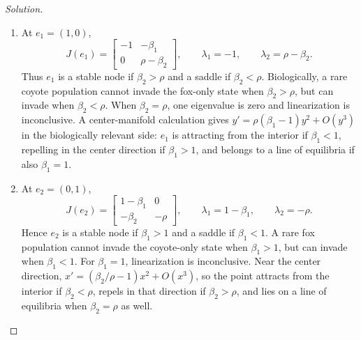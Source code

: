 \documentclass[12pt]{amsart}
\theoremstyle{conjecture}
\theoremstyle{definition}
\theoremstyle{question}
\theoremstyle{theorem}
\newenvironment{solution}
{\begin{proof}[Solution]}
{\end{proof}}
\begin{document}
\begin{enumerate}[leftmargin=2em]
\begin{solution}
\begin{enumerate}[label=(\alph*),leftmargin=2.2em]
          \begin{enumerate}[label=\roman*.,leftmargin=2em]
            \item At $e_1=(1,0)$,
            \[
                J(e_1)=\begin{bmatrix}-1&-\beta_1\\0&\rho-\beta_2\end{bmatrix},
                \qquad \lambda_1=-1,\qquad \lambda_2=\rho-\beta_2.
            \]
            Thus $e_1$ is a stable node if $\beta_2>\rho$ and a saddle if
            $\beta_2<\rho$.  Biologically, a rare coyote population cannot
            invade the fox-only state when $\beta_2>\rho$, but can invade when
            $\beta_2<\rho$.  When $\beta_2=\rho$, one eigenvalue is zero and
            linearization is inconclusive.  A center-manifold calculation gives
            $y'=\rho(\beta_1-1)y^2+O(y^3)$ in the biologically relevant side:
            $e_1$ is attracting from the interior if $\beta_1<1$, repelling in
            the center direction if $\beta_1>1$, and belongs to a line of
            equilibria if also $\beta_1=1$.

            \item At $e_2=(0,1)$,
            \[
                J(e_2)=\begin{bmatrix}1-\beta_1&0\\-\beta_2&-\rho\end{bmatrix},
                \qquad \lambda_1=1-\beta_1,\qquad \lambda_2=-\rho.
            \]
            Hence $e_2$ is a stable node if $\beta_1>1$ and a saddle if
            $\beta_1<1$.  A rare fox population cannot invade the coyote-only
            state when $\beta_1>1$, but can invade when $\beta_1<1$.  For
            $\beta_1=1$, linearization is inconclusive.  Near the center
            direction, $x'=(\beta_2/\rho-1)x^2+O(x^3)$, so the point attracts
            from the interior if $\beta_2<\rho$, repels in that direction if
            $\beta_2>\rho$, and lies on a line of equilibria when
            $\beta_2=\rho$ as well.


\end{enumerate}
\end{enumerate}
\end{solution}
\end{enumerate}
\end{document}
